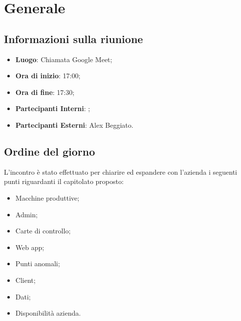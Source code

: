 \section{Generale}

\vspace{10pt}

\subsection{Informazioni sulla riunione}
\begin{itemize}
	\item \textbf{Luogo}: Chiamata Google Meet\glo{};
	\item \textbf{Ora di inizio}: 17:00;
	\item \textbf{Ora di fine}: 17:30;
	\item \textbf{Partecipanti Interni}: \team;
	\item \textbf{Partecipanti Esterni}: Alex Beggiato.
\end{itemize}

\vspace{5pt}

\subsection{Ordine del giorno}
L'incontro è stato effettuato per chiarire ed espandere con l'azienda i seguenti punti riguardanti il capitolato proposto:
\begin{itemize}
        \item Macchine produttive;
        \item Admin;
        \item Carte di controllo;
        \item Web app\glo{};
        \item Punti anomali;
        \item Client;
        \item Dati;
        \item Disponibilità azienda.
    \end{itemize}
